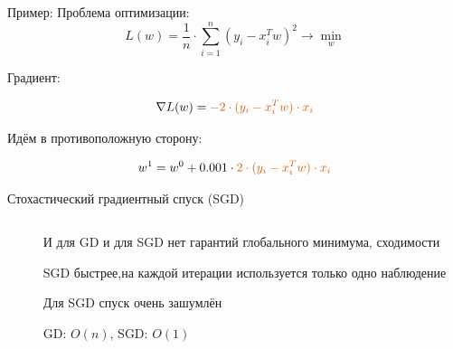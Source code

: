 \documentclass[notes,12pt, aspectratio=169]{beamer}
\newenvironment{wideitemize}{\itemize\addtolength{\itemsep}{10pt}}{\enditemize}
\begin{document}
\begin{frame}[fragile]{Пример:}
Проблема оптимизации: 
\[   
L(w) = \frac{1}{n} \cdot \sum_{i=1}^n  (y_i - x_i^T w)^2 \to \min_{w}
\]

Градиент: 

\[   
\nabla L(w) =  { \color{red} - 2 \cdot (y_i - x_i^T w)\cdot x_i }
\]

Идём в противоположную сторону: 

\[
w^1 =   w^0  +  0.001 \cdot   {\color{red}  2 \cdot (y_i - x_i^T w)\cdot x_i }
\]
\end{frame}


\begin{frame}{Стохастический градиентный спуск (SGD)}
\begin{columns}[T] %
	\begin{column}{.5\textwidth}
	\end{column}%
	\hfill%
	\begin{column}{.5\textwidth}
		\begin{wideitemize}
			\item И для GD и для SGD нет гарантий глобального минимума, сходимости
			\item SGD быстрее,на каждой итерации используется только одно наблюдение
			\item Для SGD спуск очень зашумлён 
			\item  GD: $O(n)$, SGD: $O(1)$
		\end{wideitemize}
	\end{column}%
\end{columns}
\end{frame}
\end{document}
